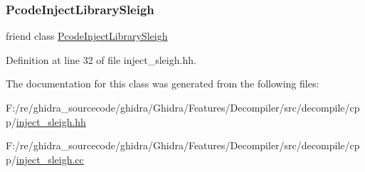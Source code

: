 \subsubsection{\texorpdfstring{PcodeInjectLibrarySleigh}{PcodeInjectLibrarySleigh}}
{\footnotesize\ttfamily friend class \mbox{\hyperlink{class_pcode_inject_library_sleigh}{Pcode\+Inject\+Library\+Sleigh}}\hspace{0.3cm}{\ttfamily [friend]}}



Definition at line 32 of file inject\+\_\+sleigh.\+hh.



The documentation for this class was generated from the following files\+:\begin{DoxyCompactItemize}
\item 
F\+:/re/ghidra\+\_\+sourcecode/ghidra/\+Ghidra/\+Features/\+Decompiler/src/decompile/cpp/\mbox{\hyperlink{inject__sleigh_8hh}{inject\+\_\+sleigh.\+hh}}\item 
F\+:/re/ghidra\+\_\+sourcecode/ghidra/\+Ghidra/\+Features/\+Decompiler/src/decompile/cpp/\mbox{\hyperlink{inject__sleigh_8cc}{inject\+\_\+sleigh.\+cc}}\end{DoxyCompactItemize}
